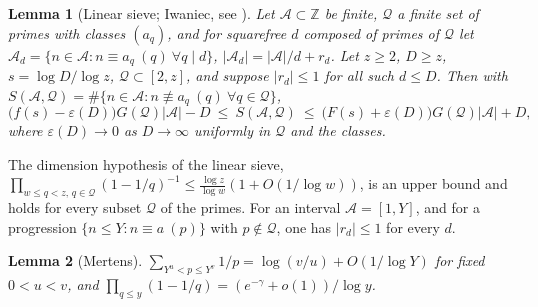 \documentclass[11pt]{amsart}
\newtheorem{lemma}{Lemma}[section]
\newcommand{\eps}{\varepsilon}
\begin{document}
\begin{lemma}[Linear sieve; Iwaniec, see {\cite[Thm.~11.12--11.13]{FI}}]\label{lin}
Let $\mathcal A\subset\mathbb Z$ be finite, $\mathcal Q$ a finite set of primes with classes $(a_q)$, and for squarefree $d$ composed of primes of $\mathcal Q$ let $\mathcal A_d=\{n\in\mathcal A:n\equiv a_q\ (q)\ \forall q\mid d\}$, $|\mathcal A_d|=|\mathcal A|/d+r_d$. Let $z\ge2$, $D\ge z$, $s=\log D/\log z$, $\mathcal Q\subset[2,z]$, and suppose $|r_d|\le1$ for all such $d\le D$. Then with $S(\mathcal A,\mathcal Q)=\#\{n\in\mathcal A:n\not\equiv a_q\ (q)\ \forall q\in\mathcal Q\}$,
\[
\bigl(f(s)-\eps(D)\bigr)G(\mathcal Q)|\mathcal A|-D\ \le\ S(\mathcal A,\mathcal Q)\ \le\ \bigl(F(s)+\eps(D)\bigr)G(\mathcal Q)|\mathcal A|+D,
\]
where $\eps(D)\to0$ as $D\to\infty$ uniformly in $\mathcal Q$ and the classes.
\end{lemma}

The dimension hypothesis of the linear sieve, $\prod_{w\le q<z,\,q\in\mathcal Q}(1-1/q)^{-1}\le\frac{\log z}{\log w}(1+O(1/\log w))$, is an upper bound and holds for every subset $\mathcal Q$ of the primes. For an interval $\mathcal A=[1,Y]$, and for a progression $\{n\le Y:n\equiv a\ (p)\}$ with $p\notin\mathcal Q$, one has $|r_d|\le1$ for every $d$.

\begin{lemma}[Mertens]\label{mertens}
$\sum_{Y^{u}<p\le Y^{v}}1/p=\log(v/u)+O(1/\log Y)$ for fixed $0<u<v$, and $\prod_{q\le y}(1-1/q)=(e^{-\gamma}+o(1))/\log y$.
\end{lemma}
\end{document}
